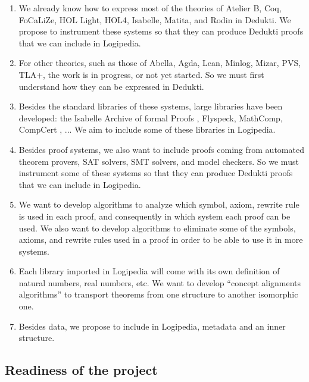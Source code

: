 \begin{enumerate}
\item We already know how to express most of the theories of {\sc Atelier B},
{\sc Coq}, {\sc FoCaLiZe}, {\sc HOL Light}, {\sc HOL4}, {\sc
Isabelle}, {\sc Matita}, and {\sc Rodin} in {\sc Dedukti}. We propose
to instrument these systems so that they can produce {\sc Dedukti}
proofs that we can include in {\sc Logipedia}.

\item
For other theories, such as those of {\sc Abella}, {\sc Agda}, {\sc
Lean}, {\sc Minlog}, {\sc Mizar}, {\sc PVS}, {\sc TLA+}, the work is
in progress, or not yet started.  So we must first understand how they
can be expressed in {\sc Dedukti}.

\item Besides the standard libraries of these systems, large libraries
  have been developed: the {\sc Isabelle Archive of formal Proofs} \cite{AFP},
  {\sc Flyspeck}\cite{Flyspeck}, {\sc MathComp}\cite{Mathcomp}, 
{\sc CompCert} \cite{Compcert}, ...  We aim to include
  some of these libraries in {\sc Logipedia}.
  
\item
Besides proof systems, we also want to include proofs coming from
automated theorem provers, SAT solvers, SMT solvers, and model
checkers.  So we must instrument some of these systems so that they
can produce {\sc Dedukti} proofs that we can include in {\sc
Logipedia}.

\item
We want to develop algorithms to analyze which symbol, axiom, rewrite
rule is used in each proof, and consequently in which system each proof
can be used. We also want to develop algorithms to eliminate some of the 
symbols, axioms, and rewrite rules used in a proof in order to be able to 
use it in more systems.


\item
Each library imported in {\sc Logipedia} will come with its own
definition of natural numbers, real numbers, etc. We want to develop
``concept alignments algorithms'' to transport theorems from one
structure to another isomorphic one.

\item 
Besides data, we propose to include in {\sc Logipedia}, metadata and
an inner structure.
\end{enumerate}


\subsection{Readiness of the project}

